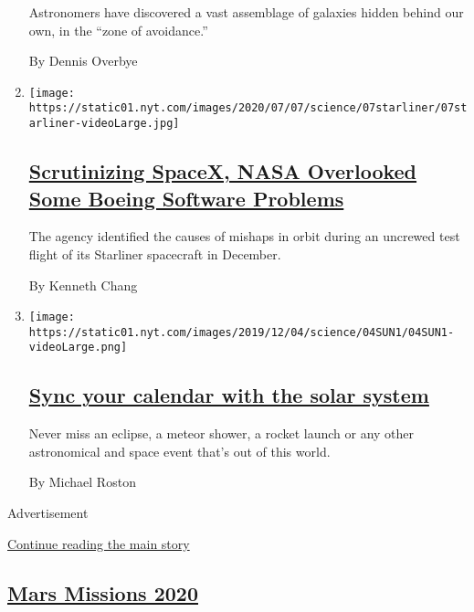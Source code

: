 \begin{enumerate}
  Astronomers have discovered a vast assemblage of galaxies hidden
  behind our own, in the ``zone of avoidance.''

  By Dennis Overbye
\item
  \texttt{[image: https://static01.nyt.com/images/2020/07/07/science/07starliner/07starliner-videoLarge.jpg]}

  \hypertarget{scrutinizing-spacex-nasa-overlooked-some-boeing-software-problems}{%
  \subsection{\texorpdfstring{\href{/2020/07/07/science/boeing-starliner-nasa.html}{Scrutinizing
  SpaceX, NASA Overlooked Some Boeing Software
  Problems}}{Scrutinizing SpaceX, NASA Overlooked Some Boeing Software Problems}}\label{scrutinizing-spacex-nasa-overlooked-some-boeing-software-problems}}

  The agency identified the causes of mishaps in orbit during an
  uncrewed test flight of its Starliner spacecraft in December.

  By Kenneth Chang
\item
  \texttt{[image: https://static01.nyt.com/images/2019/12/04/science/04SUN1/04SUN1-videoLarge.png]}

  \hypertarget{sync-your-calendar-with-the-solar-system}{%
  \subsection{\texorpdfstring{\href{/interactive/2020/science/2020-astronomy-space-calendar.html}{Sync
  your calendar with the solar
  system}}{Sync your calendar with the solar system}}\label{sync-your-calendar-with-the-solar-system}}

  Never miss an eclipse, a meteor shower, a rocket launch or any other
  astronomical and space event that's out of this world.

  By Michael Roston
\end{enumerate}

Advertisement

\protect\hyperlink{after-mid1}{Continue reading the main story}

\hypertarget{mars-missions-2020}{%
\subsection{\texorpdfstring{\href{/news-event/summer-of-mars}{Mars
Missions 2020}}{Mars Missions 2020}}\label{mars-missions-2020}}

